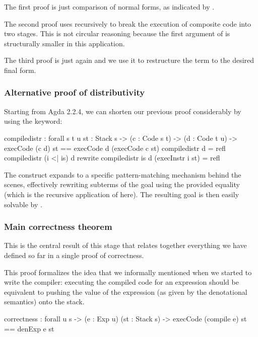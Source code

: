 The first proof is just comparison of normal forms, as indicated by
.

The second proof uses  recursively to break the execution
of composite code into two stages. This is not circular reasoning because the
first argument of  is structurally smaller in this
application.

The third proof is just  again and we use it to restructure the
term to the desired final form.

\subsubsection{Alternative proof of distributivity}

Starting from Agda 2.2.4, we can shorten our previous proof considerably
by using the  keyword:

\begin{code}
  compile\-distr : forall {s t u} {st : Stack s}
    -> (c : Code s t) -> (d : Code t u)
    -> execCode (c \app d) st == execCode d (execCode c st)
  compile\-distr \nil d = refl
  compile\-distr (i <| is) d rewrite compile\-distr is d (execInstr i st) = refl
\end{code}

\noindent The  construct expands to a specific pattern-matching
mechanism behind the scenes, effectively rewriting subterms of the goal using
the provided equality (which is the recursive application of
 here). The resulting goal is then easily solvable by
.

\subsubsection{Main correctness theorem}

This is the central result of this stage that relates together everything we
have defined so far in a single proof of correctness.

This proof formalizes the idea that we informally mentioned when we started to
write the compiler: executing the compiled code for an expression should be
equivalent to pushing the value of the expression (as given by the denotational
semantics) onto the stack.

\begin{code}
  correctness : forall {u s}
    -> (e : Exp u) (st : Stack s)
    -> execCode (compile e) st == denExp e \scons st
\end{code}

